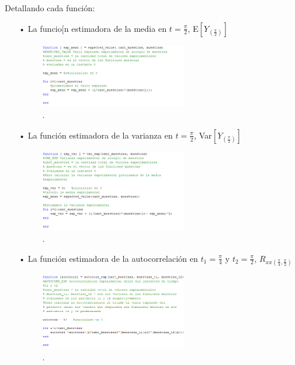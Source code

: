 Detallando cada función:
\begin{enumerate}
\item[•] La funcio[n estimadora de la media en $t = \frac{\pi}{2}$, E$\left[ Y_{(\frac{\pi}{2})}\right]$
\begin{figure}[H]
\centering
	\includegraphics[width=0.6\textwidth, trim = {0 0 0 0},clip]{./ImagenesEjercicio1/expval.png}
	\caption{.}
	\label{fig:expval}
\end{figure}

\item[•] La función estimadora de la varianza en $t = \frac{\pi}{2}$, Var$\left[Y_{(\frac{\pi}{2})}\right]$
\begin{figure}[H]
\centering
	\includegraphics[width=0.6\textwidth, trim = {0 0 0 0},clip]{./ImagenesEjercicio1/expvar.png}
	\caption{.}
	\label{fig:expvar}
\end{figure}

\item[•] La función estimadora de la autocorrelación en $t_1 = \frac{\pi}{4}$ y $t_2 = \frac{\pi}{2}$, $R_{xx(\frac{\pi}{4},\frac{\pi}{2})}$
\begin{figure}[H]
\centering
	\includegraphics[width=0.6\textwidth, trim = {0 0 0 0},clip]{./ImagenesEjercicio1/autocorr.png}
	\caption{.}
	\label{fig:autocorr}
\end{figure}


\end{enumerate}
